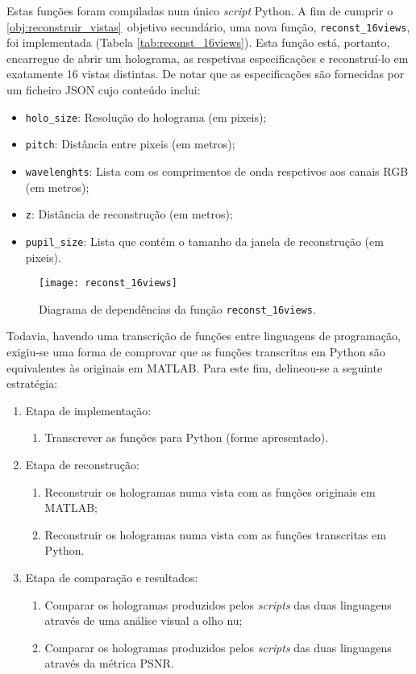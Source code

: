Estas funções foram compiladas num único \textit{script} Python. A fim de cumprir o \ref{obj:reconstruir_vistas}\textordmasculine~objetivo secundário, uma nova função, \verb|reconst_16views|, foi implementada (Tabela \ref{tab:reconst_16views}). Esta função está, portanto, encarregue de abrir um holograma, as respetivas especificações e reconstruí-lo em exatamente 16 vistas distintas. De notar que as especificações são fornecidas por um ficheiro \ac{JSON} cujo conteúdo inclui:
\begin{itemize}
    \item \verb|holo_size|: Resolução do holograma (em pixeis);
    \item \verb|pitch|: Distância entre pixeis (em metros);
    \item \verb|wavelenghts|: Lista com os comprimentos de onda respetivos aos canais \ac{RGB} (em metros);
    \item \verb|z|: Distância de reconstrução (em metros);
    \item \verb|pupil_size|: Lista que contém o tamanho da janela de reconstrução (em pixeis).
\end{itemize}

\begin{figure}[!htbp]
    \centering
    \texttt{[image: reconst\_16views]}
    \caption{Diagrama de dependências da função \texttt{reconst\_16views}.}
    \label{fig:reconst_16views}
\end{figure}

Todavia, havendo uma transcrição de funções entre linguagens de programação, exigiu-se uma forma de comprovar que as funções transcritas em Python são equivalentes às originais em MATLAB. Para este fim, delineou-se a seguinte estratégia:

\begin{enumerate}
    \item Etapa de implementação:
    \begin{enumerate}
        \item Transcrever as funções para Python (forme apresentado).
    \end{enumerate}
    
    \item Etapa de reconstrução:
    \begin{enumerate}
        \item Reconstruir os hologramas numa vista com as funções originais em MATLAB;
        \item Reconstruir os hologramas numa vista com as funções transcritas em Python.
    \end{enumerate}

    \item Etapa de comparação e resultados:
    \begin{enumerate}
        \item Comparar os hologramas produzidos pelos \textit{scripts} das duas linguagens através de uma análise visual a olho nu;
        \item Comparar os hologramas produzidos pelos \textit{scripts} das duas linguagens através da métrica \ac{PSNR}.
    \end{enumerate}
\end{enumerate}

